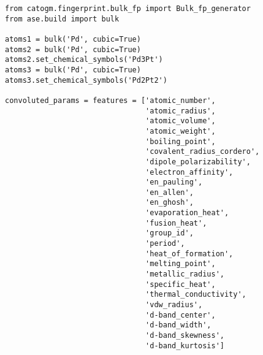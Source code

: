 \documentclass[11pt]{article}
\begin{document}
\begin{verbatim}
from catogm.fingerprint.bulk_fp import Bulk_fp_generator
from ase.build import bulk

atoms1 = bulk('Pd', cubic=True)
atoms2 = bulk('Pd', cubic=True)
atoms2.set_chemical_symbols('Pd3Pt')
atoms3 = bulk('Pd', cubic=True)
atoms3.set_chemical_symbols('Pd2Pt2')

convoluted_params = features = ['atomic_number',
                                'atomic_radius',                                            
                                'atomic_volume',                                            
                                'atomic_weight',                                            
                                'boiling_point',                                            
                                'covalent_radius_cordero',                                  
                                'dipole_polarizability',                                    
                                'electron_affinity',                                        
                                'en_pauling',                                               
                                'en_allen',                                                 
                                'en_ghosh',                                                 
                                'evaporation_heat',                                         
                                'fusion_heat',                                              
                                'group_id',                                                 
                                'period',                                                   
                                'heat_of_formation',                                        
                                'melting_point',                                            
                                'metallic_radius',                                          
                                'specific_heat',                                            
                                'thermal_conductivity',                                     
                                'vdw_radius',                                               
                                'd-band_center',                                            
                                'd-band_width',                                             
                                'd-band_skewness',                                          
                                'd-band_kurtosis']     


\end{verbatim}
\end{document}
